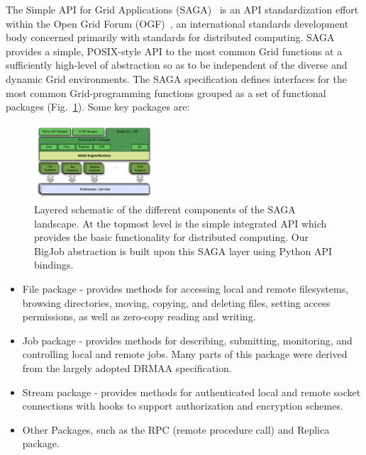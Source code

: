 \documentclass{rspublic}
\begin{document}
The Simple API for Grid Applications (SAGA)~\cite{saga_url} is an API
standardization effort within the Open Grid Forum
(OGF)~\cite{saga_gfd90}, an international standards development body
concerned primarily with standards for distributed computing. SAGA
provides a simple, POSIX-style API to the most common Grid functions
at a sufficiently high-level of abstraction so as to be independent of
the diverse and dynamic Grid environments. The SAGA specification
defines interfaces for the most common Grid-programming functions
grouped as a set of functional packages (Fig.~\ref{Fig:SAGA1}). Some
key packages are:

\begin{figure}[!ht]
 \begin{center}
     \includegraphics[width=0.40\textwidth]{stci_saga_figures-1.pdf}
 \end{center}
\caption{\small Layered schematic of the different components of the
   SAGA landscape. At the topmost level is the simple integrated API
   which provides the basic functionality for distributed
   computing. Our BigJob abstraction is built upon this SAGA layer
   using Python API bindings.} \label{Fig:SAGA1}
\end{figure}

\begin{itemize}
\item File package - provides methods for accessing local and remote
 filesystems, browsing directories, moving, copying, and deleting
 files, setting access permissions, as well as zero-copy reading and
 writing.
\item Job package - provides methods for describing, submitting,
 monitoring, and controlling local and remote jobs. Many parts of
 this package were derived from the largely adopted
 DRMAA %
 specification.
\item Stream package - provides methods for authenticated local and
 remote socket connections with hooks to support authorization and
 encryption schemes.
\item Other Packages, such as the RPC (remote procedure call) and Replica
 package.
\end{itemize}
\end{document}
